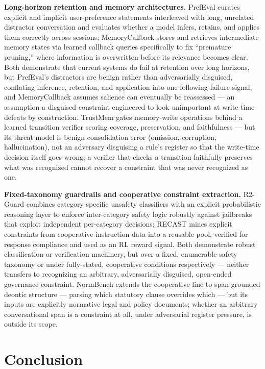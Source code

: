 \documentclass[11pt]{article}
\begin{document}
\textbf{Long-horizon retention and memory architectures.} PrefEval curates explicit and implicit user-preference statements interleaved with long, unrelated distractor conversation and evaluates whether a model infers, retains, and applies them correctly across sessions; MemoryCallback stores and retrieves intermediate memory states via learned callback queries specifically to fix ``premature pruning,'' where information is overwritten before its relevance becomes clear. Both demonstrate that current systems do fail at retention over long horizons, but PrefEval's distractors are benign rather than adversarially disguised, conflating inference, retention, and application into one following-failure signal, and MemoryCallback assumes salience can eventually be reassessed --- an assumption a disguised constraint engineered to look unimportant at write time defeats by construction. TrustMem gates memory-write operations behind a learned transition verifier scoring coverage, preservation, and faithfulness --- but its threat model is benign consolidation error (omission, corruption, hallucination), not an adversary disguising a rule's register so that the write-time decision itself goes wrong: a verifier that checks a transition faithfully preserves what was recognized cannot recover a constraint that was never recognized as one.

\textbf{Fixed-taxonomy guardrails and cooperative constraint extraction.} R2-Guard combines category-specific unsafety classifiers with an explicit probabilistic reasoning layer to enforce inter-category safety logic robustly against jailbreaks that exploit independent per-category decisions; RECAST mines explicit constraints from cooperative instruction data into a reusable pool, verified for response compliance and used as an RL reward signal. Both demonstrate robust classification or verification machinery, but over a fixed, enumerable safety taxonomy or under fully-stated, cooperative conditions respectively --- neither transfers to recognizing an arbitrary, adversarially disguised, open-ended governance constraint. NormBench extends the cooperative line to span-grounded deontic structure --- parsing which statutory clause overrides which --- but its inputs are explicitly normative legal and policy documents; whether an arbitrary conversational span is a constraint at all, under adversarial register pressure, is outside its scope.

\section{Conclusion}
\end{document}

